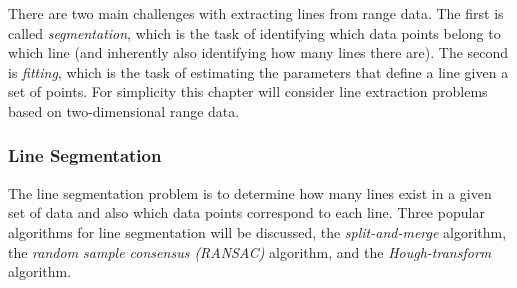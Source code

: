 There are two main challenges with extracting lines from range data. The first is called \textit{segmentation}, which is the task of identifying which data points belong to which line (and inherently also identifying how many lines there are). The second is \textit{fitting}, which is the task of estimating the parameters that define a line given a set of points. For simplicity this chapter will consider line extraction problems based on two-dimensional range data.

\subsubsection{Line Segmentation}
The line segmentation problem is to determine how many lines exist in a given set of data and also which data points correspond to each line. Three popular algorithms for line segmentation will be discussed, the \textit{split-and-merge} algorithm, the \textit{random sample consensus (RANSAC)} algorithm, and the \textit{Hough-transform} algorithm.




